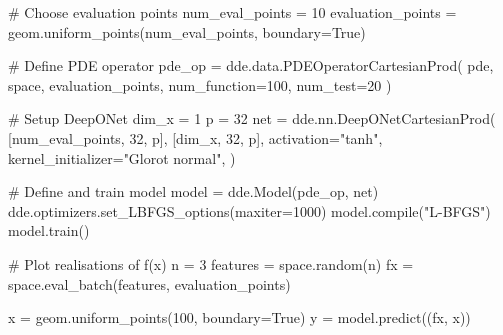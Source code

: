 \documentclass[
  spanish,
  us-letterpaper,
  DIV=11,
  numbers=noendperiod]{scrreprt}
\newenvironment{Shaded}{\begin{snugshade}}{\end{snugshade}}
\newcommand{\BuiltInTok}[1]{\textcolor[rgb]{0.00,0.23,0.31}{#1}}
\newcommand{\CommentTok}[1]{\textcolor[rgb]{0.37,0.37,0.37}{#1}}
\newcommand{\DecValTok}[1]{\textcolor[rgb]{0.68,0.00,0.00}{#1}}
\newcommand{\NormalTok}[1]{\textcolor[rgb]{0.00,0.23,0.31}{#1}}
\newcommand{\OperatorTok}[1]{\textcolor[rgb]{0.37,0.37,0.37}{#1}}
\newcommand{\StringTok}[1]{\textcolor[rgb]{0.13,0.47,0.30}{#1}}
\newcommand{\VariableTok}[1]{\textcolor[rgb]{0.07,0.07,0.07}{#1}}
\theoremstyle{plain}
\theoremstyle{definition}
\theoremstyle{remark}
\begin{document}
\begin{Shaded}
\begin{Highlighting}[]
\CommentTok{\# Choose evaluation points}
\NormalTok{num\_eval\_points }\OperatorTok{=} \DecValTok{10}
\NormalTok{evaluation\_points }\OperatorTok{=}\NormalTok{ geom.uniform\_points(num\_eval\_points, boundary}\OperatorTok{=}\VariableTok{True}\NormalTok{)}

\CommentTok{\# Define PDE operator}
\NormalTok{pde\_op }\OperatorTok{=}\NormalTok{ dde.data.PDEOperatorCartesianProd(}
\NormalTok{    pde,}
\NormalTok{    space,}
\NormalTok{    evaluation\_points,}
\NormalTok{    num\_function}\OperatorTok{=}\DecValTok{100}\NormalTok{,}
\NormalTok{    num\_test}\OperatorTok{=}\DecValTok{20}
\NormalTok{)}

\CommentTok{\# Setup DeepONet}
\NormalTok{dim\_x }\OperatorTok{=} \DecValTok{1}
\NormalTok{p }\OperatorTok{=} \DecValTok{32}
\NormalTok{net }\OperatorTok{=}\NormalTok{ dde.nn.DeepONetCartesianProd(}
\NormalTok{    [num\_eval\_points, }\DecValTok{32}\NormalTok{, p],}
\NormalTok{    [dim\_x, }\DecValTok{32}\NormalTok{, p],}
\NormalTok{    activation}\OperatorTok{=}\StringTok{"tanh"}\NormalTok{,}
\NormalTok{    kernel\_initializer}\OperatorTok{=}\StringTok{"Glorot normal"}\NormalTok{,}
\NormalTok{)}

\CommentTok{\# Define and train model}
\NormalTok{model }\OperatorTok{=}\NormalTok{ dde.Model(pde\_op, net)}
\NormalTok{dde.optimizers.set\_LBFGS\_options(maxiter}\OperatorTok{=}\DecValTok{1000}\NormalTok{)}
\NormalTok{model.}\BuiltInTok{compile}\NormalTok{(}\StringTok{"L{-}BFGS"}\NormalTok{)}
\NormalTok{model.train()}

\CommentTok{\# Plot realisations of f(x)}
\NormalTok{n }\OperatorTok{=} \DecValTok{3}
\NormalTok{features }\OperatorTok{=}\NormalTok{ space.random(n)}
\NormalTok{fx }\OperatorTok{=}\NormalTok{ space.eval\_batch(features, evaluation\_points)}

\NormalTok{x }\OperatorTok{=}\NormalTok{ geom.uniform\_points(}\DecValTok{100}\NormalTok{, boundary}\OperatorTok{=}\VariableTok{True}\NormalTok{)}
\NormalTok{y }\OperatorTok{=}\NormalTok{ model.predict((fx, x))}
\end{Highlighting}
\end{Shaded}
\end{document}
